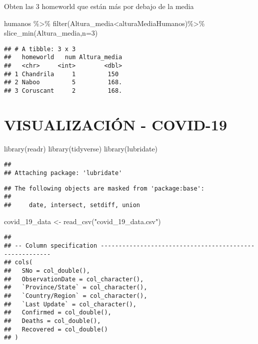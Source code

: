 \documentclass[
]{book}
\newenvironment{Shaded}{\begin{snugshade}}{\end{snugshade}}
\newcommand{\AttributeTok}[1]{\textcolor[rgb]{0.77,0.63,0.00}{#1}}
\newcommand{\DecValTok}[1]{\textcolor[rgb]{0.00,0.00,0.81}{#1}}
\newcommand{\FunctionTok}[1]{\textcolor[rgb]{0.00,0.00,0.00}{#1}}
\newcommand{\NormalTok}[1]{#1}
\newcommand{\OtherTok}[1]{\textcolor[rgb]{0.56,0.35,0.01}{#1}}
\newcommand{\SpecialCharTok}[1]{\textcolor[rgb]{0.00,0.00,0.00}{#1}}
\newcommand{\StringTok}[1]{\textcolor[rgb]{0.31,0.60,0.02}{#1}}
\begin{document}
Obten las 3 homeworld que están más por debajo de la media

\begin{Shaded}
\begin{Highlighting}[]
\NormalTok{humanos }\SpecialCharTok{\%\textgreater{}\%} \FunctionTok{filter}\NormalTok{(Altura\_media}\SpecialCharTok{\textless{}}\NormalTok{alturaMediaHumanos)}\SpecialCharTok{\%\textgreater{}\%} \FunctionTok{slice\_min}\NormalTok{(Altura\_media,}\AttributeTok{n=}\DecValTok{3}\NormalTok{)}
\end{Highlighting}
\end{Shaded}

\begin{verbatim}
## # A tibble: 3 x 3
##   homeworld   num Altura_media
##   <chr>     <int>        <dbl>
## 1 Chandrila     1         150 
## 2 Naboo         5         168.
## 3 Coruscant     2         168.
\end{verbatim}

\hypertarget{visualizaciuxf3n---covid-19}{%
\section{VISUALIZACIÓN - COVID-19}\label{visualizaciuxf3n---covid-19}}

\begin{Shaded}
\begin{Highlighting}[]
 \FunctionTok{library}\NormalTok{(readr)}
 \FunctionTok{library}\NormalTok{(tidyverse)}
 \FunctionTok{library}\NormalTok{(lubridate)}
\end{Highlighting}
\end{Shaded}

\begin{verbatim}
## 
## Attaching package: 'lubridate'
\end{verbatim}

\begin{verbatim}
## The following objects are masked from 'package:base':
## 
##     date, intersect, setdiff, union
\end{verbatim}

\begin{Shaded}
\begin{Highlighting}[]
\NormalTok{ covid\_19\_data }\OtherTok{\textless{}{-}} \FunctionTok{read\_csv}\NormalTok{(}\StringTok{"covid\_19\_data.csv"}\NormalTok{)}
\end{Highlighting}
\end{Shaded}

\begin{verbatim}
## 
## -- Column specification --------------------------------------------------------
## cols(
##   SNo = col_double(),
##   ObservationDate = col_character(),
##   `Province/State` = col_character(),
##   `Country/Region` = col_character(),
##   `Last Update` = col_character(),
##   Confirmed = col_double(),
##   Deaths = col_double(),
##   Recovered = col_double()
## )
\end{verbatim}
\end{document}
